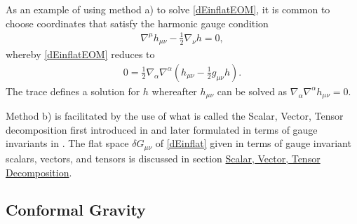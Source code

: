 \documentclass[10pt,letterpaper]{article}
\numberwithin{equation}{section}
\begin{document}
\indent As an example of using method a) to solve \eqref{dEinflatEOM}, it is common to choose coordinates that satisfy the harmonic gauge condition
\begin{eqnarray}
\nabla^\mu h_{\mu\nu} - \tfrac{1}{2}\nabla_\nu h = 0,
\end{eqnarray} 
whereby \eqref{dEinflatEOM} reduces to 
\begin{eqnarray}
0= \tfrac{1}{2} \nabla_{\alpha }\nabla^{\alpha } \left(h_{\mu\nu} - \tfrac{1}{2} g_{\mu\nu} h\right).
\end{eqnarray}
The trace defines a solution for $h$ whereafter $h_{\mu\nu}$ can be solved as $\nabla_\alpha\nabla^\alpha h_{\mu\nu} = 0$. 

\indent Method b) is facilitated by the use of what is called the Scalar, Vector, Tensor decomposition first introduced in \cite{Lifshitz1946} and later formulated in terms of gauge invariants in \cite{Bardeen1980}. The flat space $\delta G_{\mu\nu}$ of \eqref{dEinflat} given in terms of gauge invariant scalars, vectors, and tensors is discussed in section \hyperref[sec:Scalar, vector, Tensor Decomposition]{Scalar, Vector, Tensor Decomposition}. 
%
\subsection{Conformal Gravity}
\label{sec:Conformal Gravity}
\end{document}
